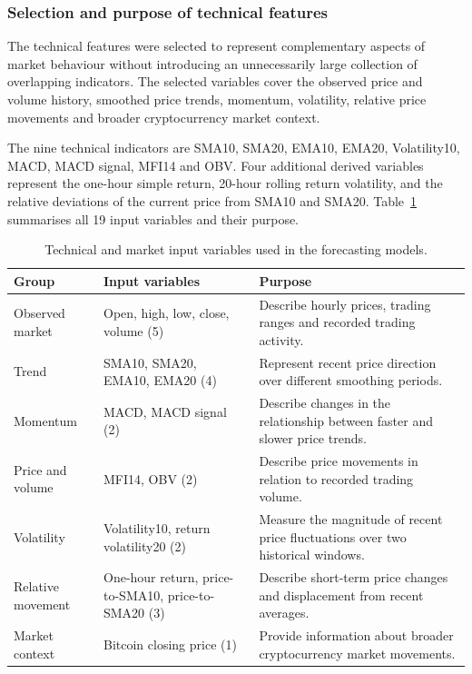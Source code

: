 \subsubsection{Selection and purpose of technical features}

The technical features were selected to represent complementary aspects of market behaviour without introducing an unnecessarily large collection of overlapping indicators. The selected variables cover the observed price and volume history, smoothed price trends, momentum, volatility, relative price movements and broader cryptocurrency market context.

The nine technical indicators are SMA10, SMA20, EMA10, EMA20, Volatility10, MACD, MACD signal, MFI14 and OBV. Four additional derived variables represent the one-hour simple return, 20-hour rolling return volatility, and the relative deviations of the current price from SMA10 and SMA20. Table~\ref{tab:technicalfeatures} summarises all 19 input variables and their purpose.

\begin{table}[htbp]
\centering
\small
\caption{Technical and market input variables used in the forecasting models.}
\label{tab:technicalfeatures}
\begin{tabular}{p{.19\linewidth}p{.35\linewidth}p{.37\linewidth}}
\toprule
Group & Input variables & Purpose \\
\midrule
Observed market
& Open, high, low, close, volume (5)
& Describe hourly prices, trading ranges and recorded trading activity. \\

Trend
& SMA10, SMA20, EMA10, EMA20 (4)
& Represent recent price direction over different smoothing periods. \\

Momentum
& MACD, MACD signal (2)
& Describe changes in the relationship between faster and slower price trends. \\

Price and volume
& MFI14, OBV (2)
& Describe price movements in relation to recorded trading volume. \\

Volatility
& Volatility10, return volatility20 (2)
& Measure the magnitude of recent price fluctuations over two historical windows. \\

Relative movement
& One-hour return, price-to-SMA10, price-to-SMA20 (3)
& Describe short-term price changes and displacement from recent averages. \\

Market context
& Bitcoin closing price (1)
& Provide information about broader cryptocurrency market movements. \\
\bottomrule
\end{tabular}
\end{table}

